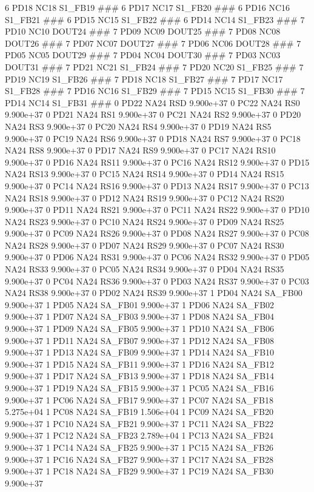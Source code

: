 6 PD18 NC18 S1_FB19 ### 
6 PD17 NC17 S1_FB20 ### 
6 PD16 NC16 S1_FB21 ### 
6 PD15 NC15 S1_FB22 ### 
6 PD14 NC14 S1_FB23 ### 
7 PD10 NC10 DOUT24 ### 
7 PD09 NC09 DOUT25 ### 
7 PD08 NC08 DOUT26 ### 
7 PD07 NC07 DOUT27 ### 
7 PD06 NC06 DOUT28 ### 
7 PD05 NC05 DOUT29 ### 
7 PD04 NC04 DOUT30 ### 
7 PD03 NC03 DOUT31 ### 
7 PD21 NC21 S1_FB24 ### 
7 PD20 NC20 S1_FB25 ### 
7 PD19 NC19 S1_FB26 ### 
7 PD18 NC18 S1_FB27 ### 
7 PD17 NC17 S1_FB28 ### 
7 PD16 NC16 S1_FB29 ### 
7 PD15 NC15 S1_FB30 ### 
7 PD14 NC14 S1_FB31 ### 
0 PD22 NA24 RSD 9.900e+37 
0 PC22 NA24 RS0 9.900e+37 
0 PD21 NA24 RS1 9.900e+37 
0 PC21 NA24 RS2 9.900e+37 
0 PD20 NA24 RS3 9.900e+37 
0 PC20 NA24 RS4 9.900e+37 
0 PD19 NA24 RS5 9.900e+37 
0 PC19 NA24 RS6 9.900e+37 
0 PD18 NA24 RS7 9.900e+37 
0 PC18 NA24 RS8 9.900e+37 
0 PD17 NA24 RS9 9.900e+37 
0 PC17 NA24 RS10 9.900e+37 
0 PD16 NA24 RS11 9.900e+37 
0 PC16 NA24 RS12 9.900e+37 
0 PD15 NA24 RS13 9.900e+37 
0 PC15 NA24 RS14 9.900e+37 
0 PD14 NA24 RS15 9.900e+37 
0 PC14 NA24 RS16 9.900e+37 
0 PD13 NA24 RS17 9.900e+37 
0 PC13 NA24 RS18 9.900e+37 
0 PD12 NA24 RS19 9.900e+37 
0 PC12 NA24 RS20 9.900e+37 
0 PD11 NA24 RS21 9.900e+37 
0 PC11 NA24 RS22 9.900e+37 
0 PD10 NA24 RS23 9.900e+37 
0 PC10 NA24 RS24 9.900e+37 
0 PD09 NA24 RS25 9.900e+37 
0 PC09 NA24 RS26 9.900e+37 
0 PD08 NA24 RS27 9.900e+37 
0 PC08 NA24 RS28 9.900e+37 
0 PD07 NA24 RS29 9.900e+37 
0 PC07 NA24 RS30 9.900e+37 
0 PD06 NA24 RS31 9.900e+37 
0 PC06 NA24 RS32 9.900e+37 
0 PD05 NA24 RS33 9.900e+37 
0 PC05 NA24 RS34 9.900e+37 
0 PD04 NA24 RS35 9.900e+37 
0 PC04 NA24 RS36 9.900e+37 
0 PD03 NA24 RS37 9.900e+37 
0 PC03 NA24 RS38 9.900e+37 
0 PD02 NA24 RS39 9.900e+37 
1 PD04 NA24 SA_FB00 9.900e+37 
1 PD05 NA24 SA_FB01 9.900e+37 
1 PD06 NA24 SA_FB02 9.900e+37 
1 PD07 NA24 SA_FB03 9.900e+37 
1 PD08 NA24 SA_FB04 9.900e+37 
1 PD09 NA24 SA_FB05 9.900e+37 
1 PD10 NA24 SA_FB06 9.900e+37 
1 PD11 NA24 SA_FB07 9.900e+37 
1 PD12 NA24 SA_FB08 9.900e+37 
1 PD13 NA24 SA_FB09 9.900e+37 
1 PD14 NA24 SA_FB10 9.900e+37 
1 PD15 NA24 SA_FB11 9.900e+37 
1 PD16 NA24 SA_FB12 9.900e+37 
1 PD17 NA24 SA_FB13 9.900e+37 
1 PD18 NA24 SA_FB14 9.900e+37 
1 PD19 NA24 SA_FB15 9.900e+37 
1 PC05 NA24 SA_FB16 9.900e+37 
1 PC06 NA24 SA_FB17 9.900e+37 
1 PC07 NA24 SA_FB18 5.275e+04 
1 PC08 NA24 SA_FB19 1.506e+04 
1 PC09 NA24 SA_FB20 9.900e+37 
1 PC10 NA24 SA_FB21 9.900e+37 
1 PC11 NA24 SA_FB22 9.900e+37 
1 PC12 NA24 SA_FB23 2.789e+04 
1 PC13 NA24 SA_FB24 9.900e+37 
1 PC14 NA24 SA_FB25 9.900e+37 
1 PC15 NA24 SA_FB26 9.900e+37 
1 PC16 NA24 SA_FB27 9.900e+37 
1 PC17 NA24 SA_FB28 9.900e+37 
1 PC18 NA24 SA_FB29 9.900e+37 
1 PC19 NA24 SA_FB30 9.900e+37 
